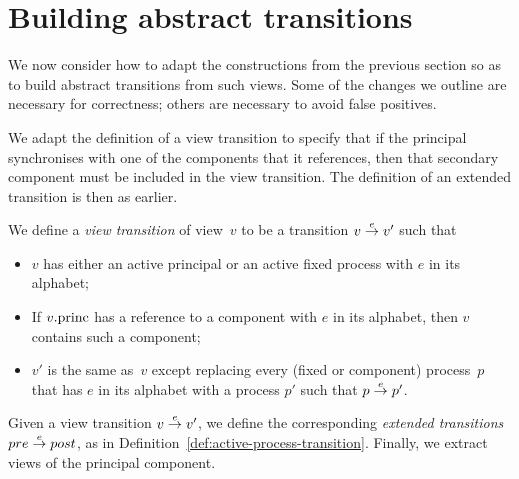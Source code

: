 
\section{Building abstract transitions}

We now consider how to adapt the constructions from the previous section so as
to build abstract transitions from such views.  Some of the changes we outline
are necessary for correctness; others are necessary to avoid false positives.




We adapt the definition of a view transition to specify that if the principal
synchronises with one of the components that it references, then that
secondary component must be included in the view transition.  The definition
of an extended transition is then as earlier. 
%
\begin{definition}
\label{def:active-process-transition-singleRef}
We define a \emph{view transition} of view~$v$ to be a transition $v \stackrel{e}\rightarrow
v'$ such that
%
\begin{itemize}
\item $v$ has either an active principal or an active fixed process with $e$
  in its alphabet;

\item If $v.\mathrm{princ}$ has a reference to a component with $e$ in its alphabet,
  then $v$ contains such a component;

\item $v'$ is the same as~$v$ except replacing every (fixed or component)
  process~$p$ that has $e$ in its alphabet with a process $p'$ such that \( p
  \stackrel{e}\rightarrow p' \).
\end{itemize}

Given a view transition $v \stackrel{e}\rightarrow v'$, we define the corresponding
\emph{extended transitions} $pre \stackrel{e}\rightarrow post$,  as in
Definition~\ref{def:active-process-transition}.  Finally, we extract views of
the principal component.  
\end{definition}


